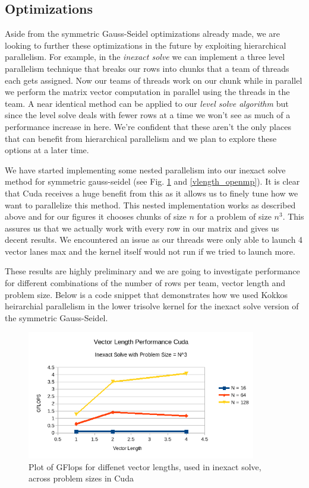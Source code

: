 \documentclass{ccr15}
\begin{document}
\subsection{Optimizations}
Aside from the symmetric Gauss-Seidel optimizations already made, we are looking to further these
optimizations in the future by exploiting hierarchical parallelism. For example, in the \emph{inexact
solve} we can implement a three level parallelism technique that breaks our rows into chunks that 
a team of threads each gets assigned. Now our teams of threads work on our chunk while in
parallel we perform the matrix vector computation in parallel using the threads in the team. A
near identical method can be applied to our \emph{level solve algorithm} but since the level solve deals
with fewer rows at a time we won't see as much of a performance increase in here. We're confident
that these aren't the only places that can benefit from hierarchical parallelism and we plan to
explore these options at a later time.

We have started implementing some nested parallelism into our inexact solve method for symmetric gauss-seidel (see Fig. \ref{vlength_cuda} and \ref{vlength_openmp}).
 It is clear that Cuda receives a huge benefit
from this as it allows us to finely tune how we want to parallelize this method. This nested implementation works as described
above and for our figures it chooses chunks of size $n$ for a problem of size $n^3$. This assures us that we 
actually work with every row in our matrix and gives us decent results. We encountered an issue as our threads
were only able to launch 4 vector lanes max and the kernel itself would not run if we tried to launch more. 

These results
are highly preliminary and we are going to investigate performance for different combinations of the number of rows per team, vector length and problem size.
Below is a code snippet that demonstrates how we used Kokkos heirarchial parallelism in the lower trisolve
kernel for the inexact solve version of the symmetric Gauss-Seidel.
\lstset{language=[Visual]C++}


\begin{figure}[H]
	\centering
	\includegraphics[width=10cm]{plots/ZAB-VectorLengthCuda.png}
	\caption{Plot of GFlops for diffenet vector lengths, used in inexact solve, across problem sizes in Cuda}
	\label{vlength_cuda}
\end{figure}
\end{document}
